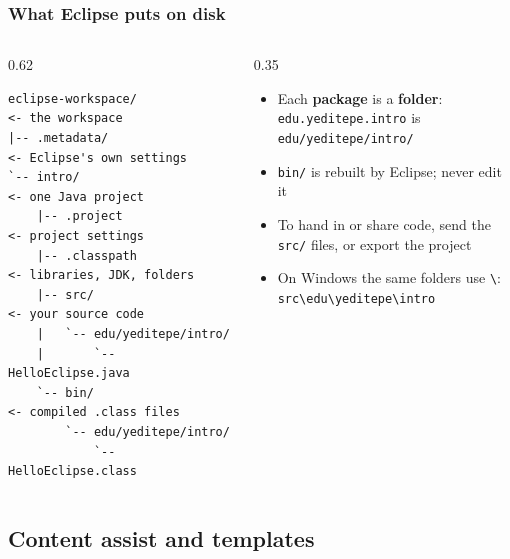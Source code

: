 \documentclass[aspectratio=169,10pt,compress]{beamer}
\begin{document}
\begin{frame}[t,fragile] \frametitle{What Eclipse puts on disk}
  \begin{columns}[T]
    \begin{column}{0.62\textwidth}


\begin{lstlisting}[language={}, basicstyle=\ttfamily\scriptsize, frame=single, backgroundcolor=\color{codebg}, rulecolor=\color{gray!40}, numbers=none]
eclipse-workspace/              <- the workspace
|-- .metadata/                  <- Eclipse's own settings
`-- intro/                      <- one Java project
    |-- .project                <- project settings
    |-- .classpath              <- libraries, JDK, folders
    |-- src/                    <- your source code
    |   `-- edu/yeditepe/intro/
    |       `-- HelloEclipse.java
    `-- bin/                    <- compiled .class files
        `-- edu/yeditepe/intro/
            `-- HelloEclipse.class
\end{lstlisting}


    \end{column}
    \begin{column}{0.35\textwidth}
      \begin{itemize}\small
        \item Each \textbf{package} is a \textbf{folder}: \texttt{edu.yeditepe.intro} is \texttt{edu/yeditepe/intro/}
        \item \texttt{bin/} is rebuilt by Eclipse; never edit it
        \item To hand in or share code, send the \texttt{src/} files, or export the project
        \item On Windows the same folders use \texttt{\textbackslash}: \texttt{src\textbackslash edu\textbackslash yeditepe\textbackslash intro}
      \end{itemize}
    \end{column}
  \end{columns}
\end{frame}


\subsection[Assist]{Content assist and templates}
\end{document}
